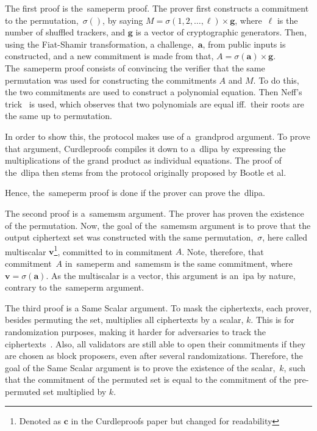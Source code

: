 The first proof is the~\gls{sameperm} proof.
The prover first constructs a commitment to the permutation,~$\sigma()$, by saying $M=\sigma(1,2,\dots,\ell)\times\mathbf{g}$, where~$\ell$ is the number of shuffled trackers, and $\mathbf{g}$ is a vector of cryptographic generators.
Then, using the Fiat-Shamir transformation, a challenge,~$\mathbf{a}$, from public inputs is constructed, and a new commitment is made from that, $A=\sigma(\mathbf{a})\times\mathbf{g}$.
The~\gls{sameperm} proof consists of convincing the verifier that the same permutation was used for constructing the commitments $A$ and $M$.
To do this, the two commitments are used to construct a polynomial equation.
Then Neff's trick~\cite{10.1145/501983.502000} is used, which observes that two polynomials are equal iff.\ their roots are the same up to permutation.

In order to show this, the protocol makes use of a~\gls{grandprod} argument.
To prove that argument, Curdleproofs compiles it down to a~\gls{dlipa} by expressing the multiplications of the grand product as individual equations.
The proof of the~\gls{dlipa} then stems from the protocol originally proposed by Bootle et al.~\cite{cryptoeprint:2016/263,Curdleproofs}

Hence, the~\gls{sameperm} proof is done if the prover can prove the~\gls{dlipa}.


The second proof is a~\gls{samemsm} argument.
The prover has proven the existence of the permutation.
Now, the goal of the~\gls{samemsm} argument is to prove that the output ciphertext set was constructed with the same permutation,~$\sigma$, here called multiscalar $\mathbf{v}$\footnote{Denoted as $\mathbf{c}$ in the Curdleproofs paper but changed for readability}, committed to in commitment $A$.
Note, therefore, that commitment~$A$ in~\gls{sameperm} and~\gls{samemsm} is the same commitment, where $\mathbf{v}=\sigma(\mathbf{a})$.
As the multiscalar is a vector, this argument is an~\gls{ipa} by nature, contrary to the~\gls{sameperm} argument.

The third proof is a Same Scalar argument.
To mask the ciphertexts, each prover, besides permuting the set, multiplies all ciphertexts by a scalar, $k$.
This is for randomization purposes, making it harder for adversaries to track the ciphertexts~\cite{Whisk2024}.
Also, all validators are still able to open their commitments if they are chosen as block proposers, even after several randomizations.
Therefore, the goal of the Same Scalar argument is to prove the existence of the scalar,~$k$, such that the commitment of the permuted set is equal to the commitment of the pre-permuted set multiplied by $k$.


